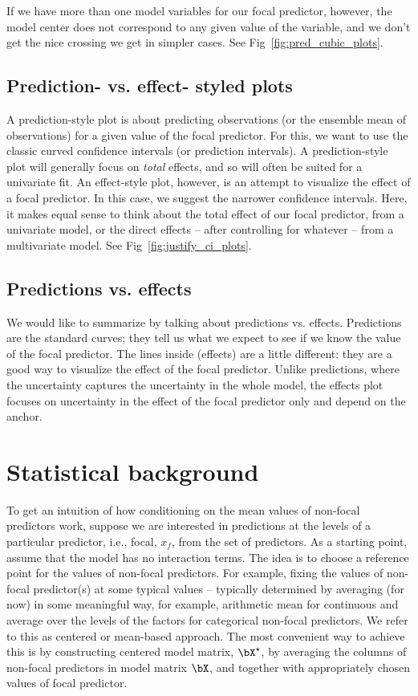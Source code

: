 If we have more than one model variables for our focal predictor, however, the model center does not correspond to any given value of the variable, and we don't get the nice crossing we get in simpler cases. See Fig~\ref{fig:pred_cubic_plots}.


\subsection{Prediction- vs. effect- styled plots}

A prediction-style plot is about predicting observations (or the ensemble mean of observations) for a given value of the focal predictor. For this, we want to use the classic curved confidence intervals (or prediction intervals). A prediction-style plot will generally focus on \emph{total} effects, and so will often be suited for a univariate fit. An effect-style plot, however, is an attempt to visualize the effect of a focal predictor. In this case, we suggest the narrower confidence intervals. Here, it makes equal sense to think about the total effect of our focal predictor, from a univariate model, or the direct effects – after controlling for whatever – from a multivariate model. See Fig~\ref{fig:justify_ci_plots}.

\subsection{Predictions vs. effects}

We would like to summarize by talking about predictions vs. effects. Predictions are the standard curves; they tell us what we expect to see if we know the value of the focal predictor. The lines inside (effects) are a little different: they are a good way to visualize the effect of the focal predictor. Unlike predictions, where the uncertainty captures the uncertainty in the whole model, the effects plot focuses on uncertainty in the effect of the focal predictor only and depend on the anchor.



\section{Statistical background}

To get an intuition of how conditioning on the mean values of non-focal predictors work, suppose we are interested in predictions at the levels of a particular predictor, i.e., focal, $x_f$, from the set of predictors. As a starting point, assume that the model has no interaction terms. The idea is to choose a reference point for the values of non-focal predictors. For example, fixing the values of non-focal predictor(s) at some typical values -- typically determined by averaging (for now) in some meaningful way, for example, arithmetic mean  for continuous and average over the levels of the factors for categorical non-focal predictors. We refer to this as centered or mean-based approach. The most convenient way to achieve this is by constructing centered model matrix, $\bX^\star$, by averaging the columns of non-focal predictors in model matrix $\bX$, and together with appropriately chosen values of focal predictor.



